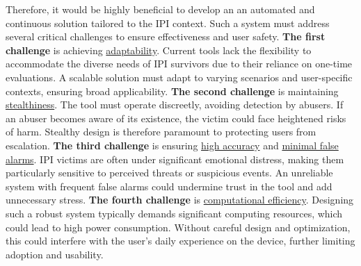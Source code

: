 
Therefore, it would be highly beneficial to develop an an automated and continuous solution tailored to the IPI context. Such a system must address several critical challenges to ensure effectiveness and user safety. \textbf{The first challenge} is achieving \underline{adaptability}. Current tools lack the flexibility to accommodate the diverse needs of IPI survivors due to their reliance on one-time evaluations. A scalable solution must adapt to varying scenarios and user-specific contexts, ensuring broad applicability. \textbf{The second challenge} is maintaining \underline{stealthiness}. The tool must operate discreetly, avoiding detection by abusers. If an abuser becomes aware of its existence, the victim could face heightened risks of harm. Stealthy design is therefore paramount to protecting users from escalation. \textbf{The third challenge} is ensuring \underline{high accuracy} and \underline{minimal false alarms}. IPI victims are often under significant emotional distress, making them particularly sensitive to perceived threats or suspicious events. An unreliable system with frequent false alarms could undermine trust in the tool and add unnecessary stress. \textbf{The fourth challenge} is \underline{computational efficiency}. Designing such a robust system typically demands significant computing resources, which could lead to high power consumption. Without careful design and optimization, this could interfere with the user's daily experience on the device, further limiting adoption and usability.


